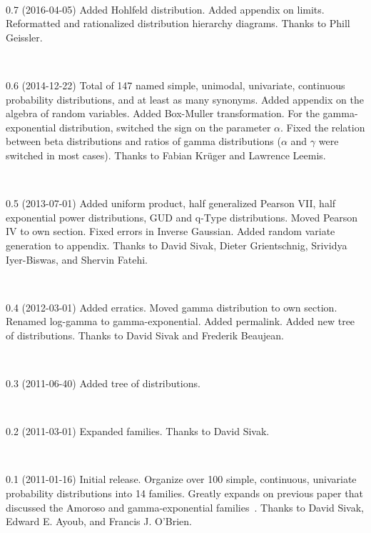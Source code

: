 {~

0.7 (2016-04-05) 
%
Added Hohlfeld distribution. %
Added appendix on limits.
Reformatted and rationalized distribution hierarchy diagrams. 
Thanks to Phill Geissler.

~

0.6 (2014-12-22)
%
Total of 147 named simple, unimodal, univariate, continuous probability distributions, and at least as many synonyms.
Added appendix on the algebra of random variables.
Added Box-Muller transformation.
For the gamma-exponential distribution, switched the sign on the parameter $\alpha$.
Fixed the relation between beta distributions and ratios of gamma distributions ($\alpha$ and $\gamma$ were switched in most cases).
Thanks to Fabian Kr\"uger and Lawrence Leemis.


~


0.5 (2013-07-01)
Added uniform product, half generalized Pearson VII, half exponential power distributions, GUD and q-Type distributions. 
Moved Pearson IV to own section.
Fixed errors in Inverse Gaussian.
Added random variate generation to appendix.
Thanks to David Sivak, Dieter Grientschnig, Srividya Iyer-Biswas, and Shervin Fatehi.

~

0.4 (2012-03-01) 
Added erratics. 
Moved gamma distribution to own section.
Renamed log-gamma to gamma-exponential.
Added permalink.
Added new tree of distributions. 
Thanks to David Sivak and Frederik Beaujean.

~

0.3 (2011-06-40) 
Added tree of distributions. 

~

0.2 (2011-03-01) 
Expanded families.  
Thanks to David Sivak. 

~

 0.1 (2011-01-16)
 Initial release. Organize over 100  simple, continuous, univariate probability distributions into 14 families. Greatly expands on previous paper that discussed the Amoroso and gamma-exponential families~\cite{_amoroso}. Thanks to David Sivak, Edward E. Ayoub, and Francis J. O'Brien.

}



